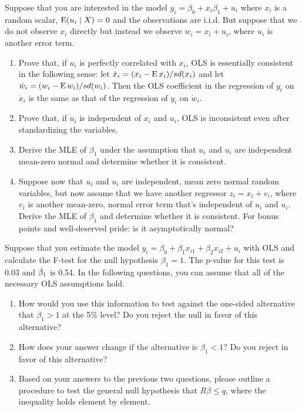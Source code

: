 \begin{hw}
  Suppose that you are interested in the model $y_i = \beta_0 +
  x_i\beta_1 + u_i$ where $x_i$ is a random scalar, $\operatorname{E}(u_i \mid X) =
  0$ and the observations are i.i.d. But suppose that we do not
  observe $x_i$ directly but instead we observe $w_i = x_i + u_i$,
  where $u_i$ is another error term.
  \begin{enumerate}
  \item Prove that, if $u_i$ is perfectly correlated with $x_i$, OLS
    is essentially consistent in the following sense: let $\dot x_i =
    (x_i - \operatorname{E} x_i) / sd(x_i)$ and let $\dot w_i = (w_i - \operatorname{E} w_i) /
    sd(w_i)$. Then the OLS coefficient in the regression of $y_t$ on
    $\dot x_i$ is the same as that of the regression of $y_i$ on $\dot
    w_i$.
  \item Prove that, if $u_i$ is independent of $x_i$ and $u_i$, OLS is
    inconsistent even after standardizing the variables.
  \item Derive the MLE of $\beta_1$ under the assumption that $u_i$ and
    $u_i$ are independent mean-zero normal and determine whether it is
    consistent.
  \item Suppose now that $u_i$ and $u_i$ are independent, mean zero
    normal random variables, but now assume that we have another
    regressor $z_i = x_i + v_i$, where $v_i$ is another mean-zero,
    normal error term that's independent of $u_i$ and $u_i$. Derive
    the MLE of $\beta_1$ and determine whether it is consistent. For bonus
    points and well-deserved pride: is it asymptotically normal?
  \end{enumerate}
\end{hw}

\begin{hw}
  Suppose that you estimate the model $y_i = \beta_0 + \beta_1 x_{i1}
  + \beta_2 x_{i2} + u_i$ with OLS and calculate the F-test for the
  null hypothesis $\beta_1 = 1$. The $p$-value for this test is
  $0.03$ and $\hat{\beta}_1$ is 0.54. In the following questions, you can
  assume that all of the necessary OLS assumptions hold.

  \begin{enumerate}
  \item How would you use this information to test against the
    one-sided alternative that $\beta_1 > 1$ at the 5\% level? Do you
    reject the null in favor of this alternative?
  \item How does your answer change if the alternative is $\beta_1 <
    1$? Do you reject in favor of this alternative?
  \item Based on your answers to the previous two questions, please
    outline a procedure to test the general null hypothesis that
    $R\beta \leq q$, where the inequality holds element by element.
  \end{enumerate}
\end{hw}

